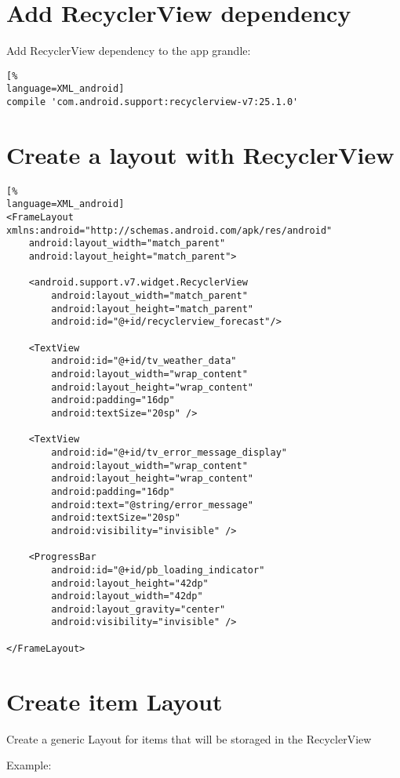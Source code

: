 \documentclass[12pt]{article} %
\begin{document}

\section{Add RecyclerView dependency}
Add RecyclerView dependency to the app grandle:

\begin{lstlisting}[%
language=XML_android]
compile 'com.android.support:recyclerview-v7:25.1.0'
\end{lstlisting}

\section{Create a layout with RecyclerView}

\begin{lstlisting}[%
language=XML_android]
<FrameLayout xmlns:android="http://schemas.android.com/apk/res/android"
	android:layout_width="match_parent"
	android:layout_height="match_parent">

	<android.support.v7.widget.RecyclerView
		android:layout_width="match_parent"
		android:layout_height="match_parent"
		android:id="@+id/recyclerview_forecast"/>

	<TextView
		android:id="@+id/tv_weather_data"
		android:layout_width="wrap_content"
		android:layout_height="wrap_content"
		android:padding="16dp"
		android:textSize="20sp" />

	<TextView
		android:id="@+id/tv_error_message_display"
		android:layout_width="wrap_content"
		android:layout_height="wrap_content"
		android:padding="16dp"
		android:text="@string/error_message"
		android:textSize="20sp"
		android:visibility="invisible" />

	<ProgressBar
		android:id="@+id/pb_loading_indicator"
		android:layout_height="42dp"
		android:layout_width="42dp"
		android:layout_gravity="center"
		android:visibility="invisible" />

</FrameLayout>
\end{lstlisting}

\section{Create item Layout}
Create a generic Layout for items that will be storaged in the RecyclerView

Example:
\end{document}
